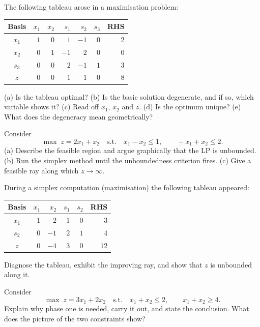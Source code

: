 \begin{problems}
  \item The following tableau arose in a maximisation problem:
        \begin{center}
        \begin{tabular}{c|rrrrr|r}
        \hline
        Basis & $x_1$ & $x_2$ & $s_1$ & $s_2$ & $s_3$ & RHS\\
        \hline
        $x_1$ & $1$ & $0$ & $1$ & $-1$ & $0$ & $2$\\
        $x_2$ & $0$ & $1$ & $-1$ & $2$ & $0$ & $0$\\
        $s_3$ & $0$ & $0$ & $2$ & $-1$ & $1$ & $3$\\
        \hline
        $z$ & $0$ & $0$ & $1$ & $1$ & $0$ & $8$\\
        \hline
        \end{tabular}
        \end{center}
        (a) Is the tableau optimal? (b) Is the basic solution degenerate,
        and if so, which variable shows it? (c) Read off $x_1$, $x_2$ and
        $z$. (d) Is the optimum unique? (e) What does the degeneracy mean
        geometrically?

  \item Consider
        \[
          \max\; z=2x_1+x_2
          \quad\text{s.t.}\quad
          x_1-x_2\le 1,\qquad -x_1+x_2\le 2 .
        \]
        (a) Describe the feasible region and argue graphically that the LP
        is unbounded. (b) Run the simplex method until the unboundedness
        criterion fires. (c) Give a feasible ray along which $z\to\infty$.

  \item During a simplex computation (maximisation) the following tableau
        appeared:
        \begin{center}
        \begin{tabular}{c|rrrr|r}
        \hline
        Basis & $x_1$ & $x_2$ & $s_1$ & $s_2$ & RHS\\
        \hline
        $x_1$ & $1$ & $-2$ & $1$ & $0$ & $3$\\
        $s_2$ & $0$ & $-1$ & $2$ & $1$ & $4$\\
        \hline
        $z$ & $0$ & $-4$ & $3$ & $0$ & $12$\\
        \hline
        \end{tabular}
        \end{center}
        Diagnose the tableau, exhibit the improving ray, and show that $z$
        is unbounded along it.

  \item Consider
        \[
          \max\; z=3x_1+2x_2
          \quad\text{s.t.}\quad
          x_1+x_2\le 2,\qquad x_1+x_2\ge 4 .
        \]
        Explain why phase one is needed, carry it out, and state the
        conclusion. What does the picture of the two constraints show?


\end{problems}
